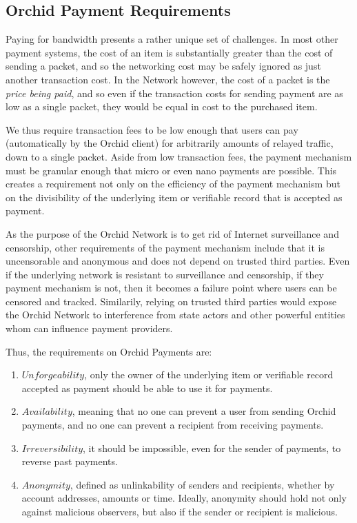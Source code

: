 \subsection{Orchid Payment Requirements}
\label{sec:paymentreqs}

Paying for bandwidth presents a rather unique set of challenges. In most other payment systems, the cost of an item is substantially greater than the cost of sending a packet, and so the networking cost may be safely ignored as just another transaction cost. In the \Orchid{} Network however, the cost of a packet is the \emph{price being paid}, and so even if the transaction costs for sending payment are as low as a single packet, they would be equal in cost to the purchased item.

We thus require transaction fees to be low enough that users can pay (automatically by the Orchid client) for arbitrarily amounts of relayed traffic, down to a single packet. Aside from low transaction fees, the payment mechanism must be granular enough that micro or even nano payments are possible. This creates a requirement not only on the efficiency of the payment mechanism but on the divisibility of the underlying item or verifiable record that is accepted as payment.

As the purpose of the Orchid Network is to get rid of Internet surveillance and censorship, other requirements of the payment mechanism include that it is uncensorable and anonymous and does not depend on trusted third parties. Even if the underlying network is resistant to surveillance and censorship, if they payment mechanism is not, then it becomes a failure point where users can be censored and tracked. Similarily, relying on trusted third parties would expose the Orchid Network to interference from state actors and other powerful entities whom can influence payment providers.

Thus, the requirements on Orchid Payments are:
\begin{enumerate}
\item $Unforgeability$, only the owner of the underlying item or verifiable record accepted as payment should be able to use it for payments.
\item $Availability$, meaning that no one can prevent a user from sending Orchid payments, and no one can prevent a recipient from receiving payments.
\item $Irreversibility$, it should be impossible, even for the sender of payments, to reverse past payments.
\item $Anonymity$, defined as unlinkability of senders and recipients, whether by account addresses, amounts or time. Ideally, anonymity should hold not only against malicious observers, but also if the sender or recipient is malicious.
\end{enumerate}

